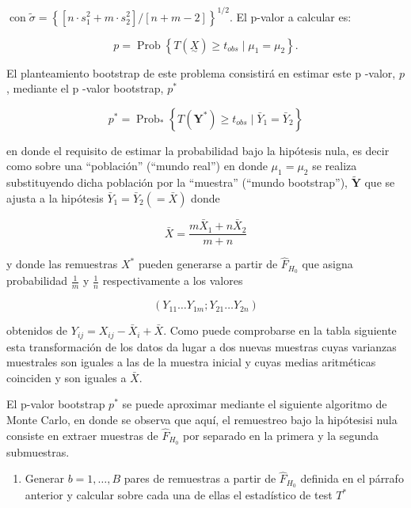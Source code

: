 \documentclass[
]{article}
\providecommand{\tightlist}{%
  \setlength{\itemsep}{0pt}\setlength{\parskip}{0pt}}
\begin{document}
\(\operatorname{con} \tilde{\sigma}=\left\{\left[n \cdot s_{1}^{2}+m \cdot s_{2}^{2}\right] /[n+m-2]\right\}^{1 / 2}\).
El p-valor a calcular es:

\[
p=\operatorname{Prob}\left\{T(\underset{\sim}{X}) \geq t_{o b s} \mid \mu_{1}=\mu_{2}\right\} .
\]

El planteamiento bootstrap de este problema consistirá en estimar este p -valor, \(p\), mediante el p -valor bootstrap, \(p^{*}\)

\[
p^{*}=\operatorname{Prob}_{*}\left\{T\left(\mathbf{Y}^{*}\right) \geq t_{o b s} \mid \bar{Y}_{1}=\bar{Y}_{2}\right\}
\]

en donde el requisito de estimar la probabilidad bajo la hipótesis nula, es decir como sobre una ``población'' (``mundo real'') en donde \(\mu_{1}=\mu_{2}\) se realiza substituyendo dicha población por la ``muestra'' (``mundo bootstrap''), \(\tilde{\mathbf{Y}}\) que se ajusta a la hipótesis \(\bar{Y}_{1}=\bar{Y}_{2}(=\bar{X})\) donde

\[
\bar{X}=\frac{m \bar{X}_{1}+n \bar{X}_{2}}{m+n}
\]

y donde las remuestras \(X^{*}\) pueden generarse a partir de \(\widehat{F}_{H_{0}}\) que asigna probabilidad \(\frac{1}{m}\) y \(\frac{1}{n}\) respectivamente a los valores

\[
\left(Y_{11} \ldots Y_{1 m} ; Y_{21} \ldots Y_{2 n}\right)
\]

obtenidos de \(Y_{i j}=X_{i j}-\bar{X}_{i}+\bar{X}\). Como puede comprobarse en la tabla siguiente esta transformación de los datos da lugar a dos nuevas muestras cuyas varianzas muestrales son iguales a las de la muestra inicial y cuyas medias aritméticas coinciden y son iguales a \(\bar{X}\).

El p-valor bootstrap \(p^{*}\) se puede aproximar mediante el siguiente algoritmo de Monte Carlo, en donde se observa que aquí, el remuestreo bajo la hipótesisi nula consiste en extraer muestras de \(\widehat{F}_{H_{0}}\) por separado en la primera y la segunda submuestras.

\begin{enumerate}
\def\labelenumi{\arabic{enumi}.}
\tightlist
\item
  Generar \(b=1, \ldots, B\) pares de remuestras a partir de \(\widehat{F}_{H_{0}}\) definida en el párrafo anterior y calcular sobre cada una de ellas el estadístico de test
  \(T^{*}\)
\end{enumerate}
\end{document}
